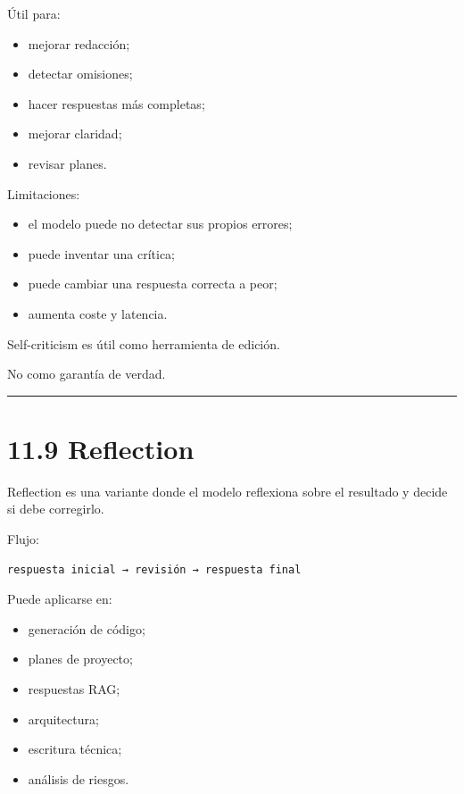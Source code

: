 Útil para:

\begin{itemize}
\tightlist
\item
  mejorar redacción;
\item
  detectar omisiones;
\item
  hacer respuestas más completas;
\item
  mejorar claridad;
\item
  revisar planes.
\end{itemize}

Limitaciones:

\begin{itemize}
\tightlist
\item
  el modelo puede no detectar sus propios errores;
\item
  puede inventar una crítica;
\item
  puede cambiar una respuesta correcta a peor;
\item
  aumenta coste y latencia.
\end{itemize}

Self-criticism es útil como herramienta de edición.

No como garantía de verdad.

\begin{center}\rule{0.5\linewidth}{0.5pt}\end{center}

\section{11.9 Reflection}\label{reflection}

Reflection es una variante donde el modelo reflexiona sobre el resultado
y decide si debe corregirlo.

Flujo:

\begin{lstlisting}
respuesta inicial → revisión → respuesta final
\end{lstlisting}

Puede aplicarse en:

\begin{itemize}
\tightlist
\item
  generación de código;
\item
  planes de proyecto;
\item
  respuestas RAG;
\item
  arquitectura;
\item
  escritura técnica;
\item
  análisis de riesgos.
\end{itemize}

